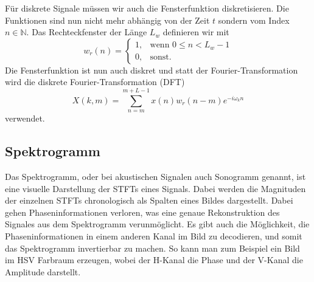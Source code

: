 Für diskrete Signale müssen wir auch die Fensterfunktion diskretisieren.
Die Funktionen sind nun nicht mehr abhängig von der Zeit $t$ sondern vom 
Index $n \in \mathbb{N}$.
Das Rechteckfenster der Länge $L_w$ definieren wir mit
\begin{equation}
    w_r(n) = 
    \begin{cases}
    1,& \text{wenn } 0 \le n < L_w-1\\
    0, & \text{sonst.}
    \end{cases}
\end{equation}
Die Fensterfunktion ist nun auch diskret und statt
der Fourier-Transformation wird die diskrete Fourier-Transformation (DFT)
\begin{equation}
    X(k, m) = \sum_{n = m}^{m + L - 1} x(n) w_r(n-m) e^{ -i \omega_k n}
\end{equation}
verwendet.
\subsection{Spektrogramm}

Das Spektrogramm, oder bei akustischen Signalen auch Sonogramm genannt, ist eine visuelle
%
%
Darstellung der STFTs eines Signals. 
Dabei werden die Magnituden der einzelnen STFTs chronologisch
als Spalten eines Bildes dargestellt.
Dabei gehen Phaseninformationen verloren, was eine genaue Rekonstruktion
des Signales aus dem Spektrogramm verunmöglicht.
Es gibt auch die Möglichkeit, die Phaseninformationen in einem anderen Kanal im 
Bild zu decodieren, und somit das Spektrogramm invertierbar zu machen.
So kann man zum Beispiel ein Bild im HSV Farbraum erzeugen, wobei
%
der H-Kanal die Phase und der V-Kanal die Amplitude darstellt.

